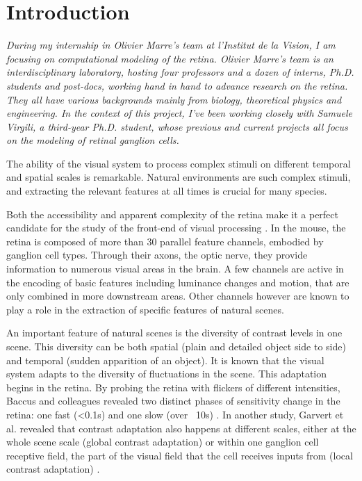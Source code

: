 \section{Introduction}\label{sec:introduction}

\textit{During my internship in Olivier Marre's team at l'Institut de la
    Vision, I am
    focusing on computational modeling of the retina. Olivier Marre's team is an
    interdisciplinary laboratory, hosting four professors and a dozen of interns,
    Ph.D. students and post-docs, working hand in hand to advance research
    on the retina. They all have various backgrounds mainly from biology,
    theoretical physics and engineering. In the context of this project, I've been
    working
    closely with Samuele Virgili, a third-year Ph.D. student, whose previous and
    current projects all focus on the modeling of retinal ganglion cells.}

The ability of the visual system to process complex stimuli on different
temporal and spatial scales is remarkable.
Natural environments are such complex stimuli, and extracting the relevant
features at all times is crucial for many species.

Both the accessibility and apparent complexity	of the retina make it a
perfect candidate for the study of the front-end of visual processing
\citep{gollisch_eye_2010}. In the mouse, the retina is composed of more
than 30 parallel feature channels, embodied by ganglion cell types. Through
their axons, the optic nerve, they provide information to numerous visual areas
in the brain. %
A few channels are active in the encoding of basic features including luminance
changes and motion, that are only combined in more downstream areas. Other
channels however are known to play a role in the extraction of specific
features of natural scenes.

An important feature of natural scenes is the diversity of contrast levels in
one scene. This diversity can be both spatial (plain and detailed object side
to side) and temporal (sudden apparition of an object). It is known that the
visual system adapts to the diversity of fluctuations in the scene. This
adaptation begins in the retina. By probing the retina with flickers of
different intensities, Baccus and colleagues revealed two distinct phases of
sensitivity change in the retina: one fast (<0.1s) and one slow (over ~10s)
\citep{baccus_fast_2002}.
In another study, Garvert et al. revealed that contrast adaptation also
happens at different scales, either at the whole scene scale (global contrast
adaptation) or within one ganglion cell receptive field, the part of the visual
field that the cell receives inputs from (local contrast adaptation)
\citep{garvert_local_2013}.

